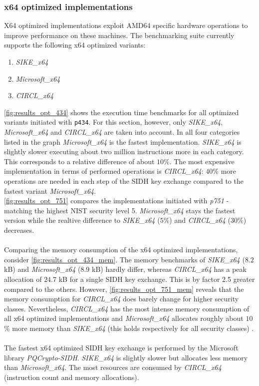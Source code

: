 \subsubsection{x64 optimized implementations}\label{sec:analysis_x64}
X64 optimized implementations exploit AMD64 specific hardware operations to improve performance on these machines. The benchmarking suite currently supports the following x64 optimized variants:
\begin{enumerate}
\item \textit{SIKE\_x64}
\item \textit{Microsoft\_x64}
\item \textit{\gls{CIRCL}\_x64}
\end{enumerate}
\autoref{fig:results_opt_434} shows the execution time benchmarks for all optimized variants initiated with \texttt{p434}. For this section, however, only \textit{SIKE\_x64}, \textit{Microsoft\_x64} and \textit{\gls{CIRCL}\_x64} are taken into account. In all four categories listed in the graph \textit{Microsoft\_x64}  is the fastest implementation. \textit{SIKE\_x64} is slightly slower executing about two million instructions more in each category. This corresponds to a relative difference of about $10$\%. The most expensive implementation in terms of performed operations is \textit{\gls{CIRCL}\_x64}: $40$\% more operations are needed in each step of the \gls{SIDH} key exchange compared to the fastest variant \textit{Microsoft\_x64}.
\\
\autoref{fig:results_opt_751} compares the implementations initiated with \textit{p751} - matching the highest \gls{NIST} security level 5. \textit{Microsoft\_x64} stays the fastest version while the realtive difference to \textit{SIKE\_x64} ($5$\%) and \textit{\gls{CIRCL}\_x64} ($30$\%) decreases.
\\\\
Comparing the memory consumption of the x64 optimized implementations, consider \autoref{fig:results_opt_434_mem}. The memory benchmarks of \textit{SIKE\_x64} ($8.2$ \gls{kB}) and \textit{Microsoft\_x64} ($8.9$ \gls{kB}) hardly differ, whereas \textit{\gls{CIRCL}\_x64} has a peak allocation of $24.7$ \gls{kB} for a single \gls{SIDH} key exchange. This is by factor 2.5 greater compared to the others. However, \autoref{fig:results_opt_751_mem} reveals that the memory consumption for \textit{\gls{CIRCL}\_x64} does barely change for higher security classes. Nevertheless,  \textit{\gls{CIRCL}\_x64} has the most intense memory consumption of all x64 optimized implementations and \textit{Microsoft\_x64} allocates roughly about $10$\% more memory than \textit{SIKE\_x64} (this holds respectively for all security classes) .
\\\\
The fastest x64 optimized \gls{SIDH} key exchange is performed by the Microsoft library \textit{ \gls{PQCrypto-SIDH}}. \textit{SIKE\_x64} is slightly slower but allocates less memory than \textit{Microsoft\_x64}. The most resources are consumed by \textit{\gls{CIRCL}\_x64} (instruction count and memory allocations).

